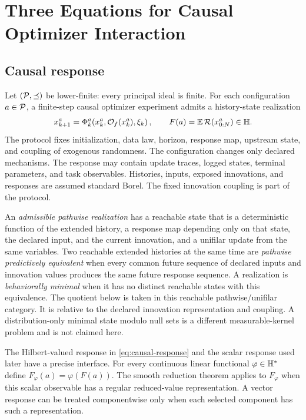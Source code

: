 \section{Three Equations for Causal Optimizer Interaction}
\label{sec:language}

\subsection{Causal response}

Let $(\mathcal P,\preceq)$ be lower-finite: every principal ideal is finite.  For each configuration $a\in\mathcal P$, a finite-step causal optimizer experiment admits a history-state realization
\begin{equation}
x_{k+1}^{a}=\Phi_k^a\!\left(x_k^a,\mathcal O_f(x_k^a),\xi_k\right),
\qquad
F(a)=\mathbb E\,\mathcal R(x_{0:N}^a)\in\mathbb H.
\label{eq:causal-response}
\end{equation}
The protocol fixes initialization, data law, horizon, response map, upstream state, and coupling of exogenous randomness.  The configuration changes only declared mechanisms.  The response may contain update traces, logged states, terminal parameters, and task observables.  Histories, inputs, exposed innovations, and responses are assumed standard Borel.  The fixed innovation coupling is part of the protocol.

An \emph{admissible pathwise realization} has a reachable state that is a deterministic function of the extended history, a response map depending only on that state, the declared input, and the current innovation, and a unifilar update from the same variables.  Two reachable extended histories at the same time are \emph{pathwise predictively equivalent} when every common future sequence of declared inputs and innovation values produces the same future response sequence.  A realization is \emph{behaviorally minimal} when it has no distinct reachable states with this equivalence.  The quotient below is taken in this reachable pathwise/unifilar category.  It is relative to the declared innovation representation and coupling.  A distribution-only minimal state modulo null sets is a different measurable-kernel problem and is not claimed here.

The Hilbert-valued response in \cref{eq:causal-response} and the scalar response used later have a precise interface.  For every continuous linear functional $\varphi\in\mathbb H^*$ define $F_\varphi(a)=\varphi(F(a))$.  The smooth reduction theorem applies to $F_\varphi$ when this scalar observable has a regular reduced-value representation.  A vector response can be treated componentwise only when each selected component has such a representation.

